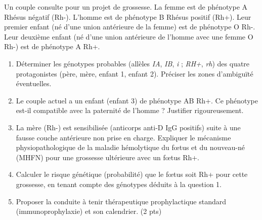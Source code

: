 \documentclass[11pt]{article}
\begin{document}
\begin{exercice}
Un couple consulte pour un projet de grossesse. La femme est de phénotype A Rhésus négatif (Rh-). L'homme est de phénotype B Rhésus positif (Rh+).
Leur premier enfant (né d'une union antérieure de la femme) est de phénotype O Rh-.
Leur deuxième enfant (né d'une union antérieure de l'homme avec une femme O Rh-) est de phénotype A Rh+.
\begin{enumerate}
\item Déterminer les génotypes probables (allèles \textit{IA}, \textit{IB}, \textit{i} ; \textit{RH+}, \textit{rh}) des quatre protagonistes (père, mère, enfant 1, enfant 2). Préciser les zones d'ambiguïté éventuelles.
\item Le couple actuel a un enfant (enfant 3) de phénotype AB Rh+. Ce phénotype est-il compatible avec la paternité de l'homme ? Justifier rigoureusement.
\item La mère (Rh-) est sensibilisée (anticorps anti-D IgG positifs) suite à une fausse couche antérieure non prise en charge. Expliquer le mécanisme physiopathologique de la maladie hémolytique du fœtus et du nouveau-né (MHFN) pour une grossesse ultérieure avec un fœtus Rh+.
\item Calculer le risque génétique (probabilité) que le fœtus soit Rh+ pour cette grossesse, en tenant compte des génotypes déduits à la question 1.
\item Proposer la conduite à tenir thérapeutique prophylactique standard (immunoprophylaxie) et son calendrier. (2 pts)
\end{enumerate}
\end{exercice}
\end{document}
